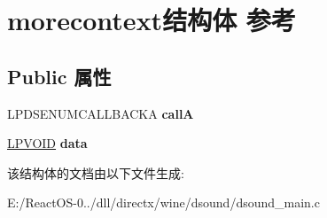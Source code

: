 \hypertarget{structmorecontext}{}\section{morecontext结构体 参考}
\label{structmorecontext}
\subsection*{Public 属性}
\begin{DoxyCompactItemize}
\item 
\mbox{\label{structmorecontext_aeab9f3b249ba427e9b7ead2dcfaa84b9}} 
L\+P\+D\+S\+E\+N\+U\+M\+C\+A\+L\+L\+B\+A\+C\+KA {\bfseries callA}
\item 
\mbox{\label{structmorecontext_a7993b05690c65a65f807a1c67818f9f7}} 
\hyperlink{interfacevoid}{L\+P\+V\+O\+ID} {\bfseries data}
\end{DoxyCompactItemize}


该结构体的文档由以下文件生成\+:\begin{DoxyCompactItemize}
\item 
E\+:/\+React\+O\+S-\/0../dll/directx/wine/dsound/dsound\+\_\+main.\+c\end{DoxyCompactItemize}
